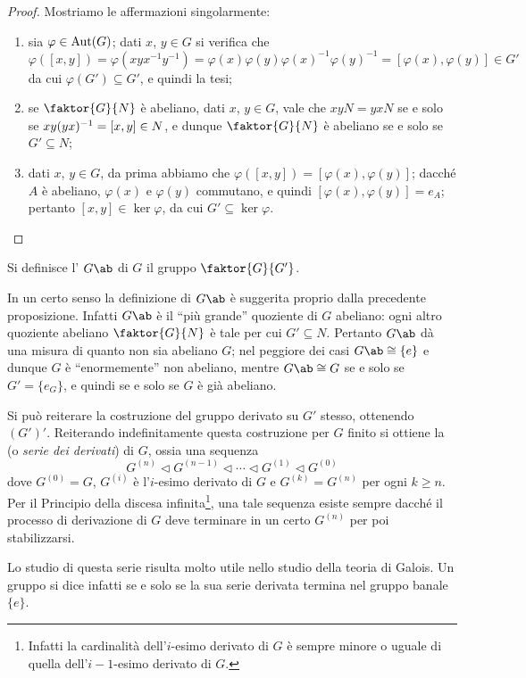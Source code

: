 \documentclass[11pt]{scrartcl}
\begin{document}
	\begin{proof}
		Mostriamo le affermazioni singolarmente:
		\begin{enumerate}[(1)]
			\item sia $\varphi \in \operatorname{Aut}(G)$; dati $x$, $y \in G$ si verifica che
			\[
			\varphi([x, y]) = \varphi(xyx^{-1}y^{-1}) = \varphi(x)\varphi(y)
			\varphi(x)^{-1}\varphi(y)^{-1} = [\varphi(x), \varphi(y)] \in G'
			\]da cui $\varphi(G') \subseteq G'$, e quindi la tesi;
			\item se $\faktor{G}{N}$ è abeliano, dati $x$, $y \in G$, vale che $xyN = yxN$
			se e solo se $xy(yx)^{-1} = [x, y] \in N$, e dunque $\faktor{G}{N}$ è abeliano
			se e solo se $G' \subseteq N$;
			\item dati $x$, $y \in G$, da prima abbiamo che $\varphi([x, y]) = [\varphi(x), \varphi(y)]$; dacché $A$ è abeliano, $\varphi(x)$ e $\varphi(y)$ commutano,
			e quindi $[\varphi(x), \varphi(y)] = e_A$; pertanto $[x, y] \in \ker \varphi$,
			da cui $G' \subseteq \ker \varphi$.
		\end{enumerate}
	\end{proof}
	
	\begin{definition}
		Si definisce l' $G\ab$ di $G$ il gruppo
		$\faktor{G}{G'}$.
	\end{definition}
	
	\begin{remark}
		In un certo senso la definizione di $G\ab$ è suggerita proprio dalla precedente
		proposizione. Infatti $G\ab$ è il ``più grande'' quoziente di $G$ abeliano:
		ogni altro quoziente abeliano $\faktor{G}{N}$ è tale per cui $G' \subseteq N$.
		Pertanto $G\ab$ dà una misura di quanto non sia abeliano $G$; nel peggiore dei
		casi $G\ab \cong \{e\}$ e dunque $G$ è ``enormemente'' non abeliano, mentre $G\ab \cong G$
		se e solo se $G' = \{e_G\}$, e quindi se e solo se $G$ è già abeliano.
	\end{remark}
	
	\begin{remark}
		Si può reiterare la costruzione del gruppo derivato su $G'$ stesso, ottenendo
		$(G')'$. Reiterando indefinitamente questa costruzione per $G$ finito
		si ottiene la
		 (o \textit{serie dei derivati}) di $G$, ossia una sequenza
		\[ G^{(n)} \triangleleft G^{(n-1)} \triangleleft \cdots \triangleleft G^{(1)} \triangleleft G^{(0)} \]
		dove $G^{(0)} = G$, $G^{(i)}$ è l'$i$-esimo derivato di $G$ e $G^{(k)} = G^{(n)}$ per
		ogni $k \geq n$. Per il Principio della
		discesa infinita\footnote{Infatti la cardinalità dell'$i$-esimo derivato di $G$ è sempre minore o uguale di quella dell'$i-1$-esimo derivato di $G$.}, una tale sequenza esiste sempre dacché il processo di derivazione di $G$ deve terminare in un certo $G^{(n)}$ per
		poi stabilizzarsi. \medskip
		
		
		Lo studio di questa serie risulta molto utile nello studio della teoria di Galois.
		Un gruppo si dice infatti  se e solo se la sua serie derivata termina
		nel gruppo banale $\{ e \}$.
	\end{remark}
	
\end{document}
